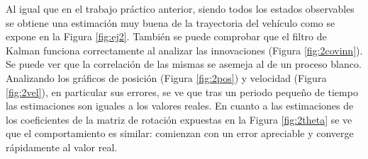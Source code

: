 
	Al igual que en el trabajo práctico anterior, siendo todos los estados observables se obtiene una estimación muy buena de la trayectoria del vehículo como se expone en la Figura \ref{fig:ej2}. También se puede comprobar que el filtro de Kalman funciona correctamente al analizar las innovaciones (Figura \ref{fig:2covinn}). Se puede ver que la correlación de las mismas se asemeja al de un proceso blanco.
	Analizando los gráficos de posición (Figura \ref{fig:2pos}) y velocidad (Figura \ref{fig:2vel}), en particular sus errores, se ve que tras un periodo pequeño de tiempo las estimaciones son iguales a los valores reales. En cuanto a las estimaciones de los coeficientes de la matriz de rotación expuestas en la Figura \ref{fig:2theta} se ve que el comportamiento es similar: comienzan con un error apreciable y converge rápidamente al valor real.

